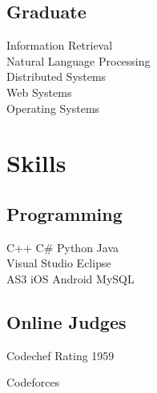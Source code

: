 \documentclass[]{resume-openfont}
\begin{document}
\begin{minipage}[t]{0.30\textwidth}
\subsection{Graduate}
Information Retrieval \\
Natural Language Processing \\
Distributed Systems \\
Web Systems \\
Operating Systems
\sectionsep


\section{Skills}
\subsection{Programming}
C++ \textbullet{}   C\# \textbullet{} Python \textbullet{} Java \\
Visual Studio \textbullet{} Eclipse \textbullet{} \\
AS3 \textbullet{} iOS \textbullet{} Android \textbullet{} MySQL
\sectionsep

\subsection{Online Judges}
Codechef Rating 1959

Codeforces
%
%

\end{minipage} 
\hfill
\end{document}
